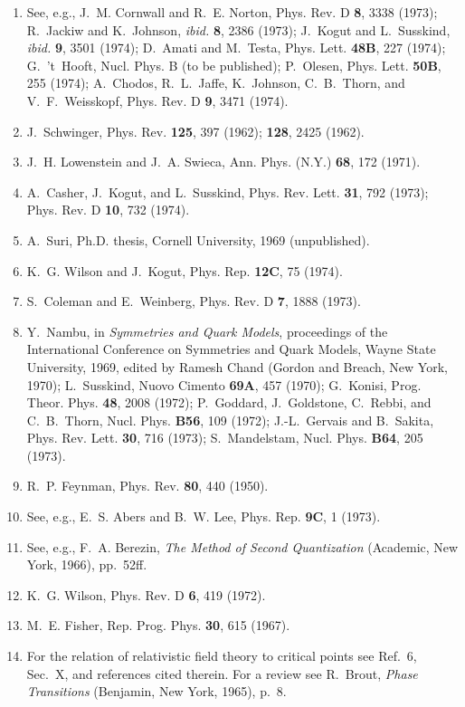 \begin{center}
\begin{minipage}{0.93\textwidth}
\begin{enumerate}[leftmargin=1.6em,itemsep=1pt,parsep=0pt,topsep=2pt]
\item See, e.g., J.~M. Cornwall and R.~E. Norton, Phys. Rev. D \textbf{8}, 3338 (1973); R.~Jackiw and K.~Johnson, \emph{ibid.} \textbf{8}, 2386 (1973); J.~Kogut and L.~Susskind, \emph{ibid.} \textbf{9}, 3501 (1974); D.~Amati and M.~Testa, Phys. Lett. \textbf{48B}, 227 (1974); G.~'t~Hooft, Nucl. Phys. B (to be published); P.~Olesen, Phys. Lett. \textbf{50B}, 255 (1974); A.~Chodos, R.~L.~Jaffe, K.~Johnson, C.~B.~Thorn, and V.~F.~Weisskopf, Phys. Rev. D \textbf{9}, 3471 (1974).
\item J.~Schwinger, Phys. Rev. \textbf{125}, 397 (1962); \textbf{128}, 2425 (1962).
\item J.~H. Lowenstein and J.~A. Swieca, Ann. Phys. (N.Y.) \textbf{68}, 172 (1971).
\item A.~Casher, J.~Kogut, and L.~Susskind, Phys. Rev. Lett. \textbf{31}, 792 (1973); Phys. Rev. D \textbf{10}, 732 (1974).
\item A.~Suri, Ph.D. thesis, Cornell University, 1969 (unpublished).
\item K.~G. Wilson and J.~Kogut, Phys. Rep. \textbf{12C}, 75 (1974).
\item S.~Coleman and E.~Weinberg, Phys. Rev. D \textbf{7}, 1888 (1973).
\item Y.~Nambu, in \emph{Symmetries and Quark Models}, proceedings of the International Conference on Symmetries and Quark Models, Wayne State University, 1969, edited by Ramesh Chand (Gordon and Breach, New York, 1970); L.~Susskind, Nuovo Cimento \textbf{69A}, 457 (1970); G.~Konisi, Prog. Theor. Phys. \textbf{48}, 2008 (1972); P.~Goddard, J.~Goldstone, C.~Rebbi, and C.~B.~Thorn, Nucl. Phys. \textbf{B56}, 109 (1972); J.-L.~Gervais and B.~Sakita, Phys. Rev. Lett. \textbf{30}, 716 (1973); S.~Mandelstam, Nucl. Phys. \textbf{B64}, 205 (1973).
\item R.~P. Feynman, Phys. Rev. \textbf{80}, 440 (1950).
\item See, e.g., E.~S. Abers and B.~W. Lee, Phys. Rep. \textbf{9C}, 1 (1973).
\item See, e.g., F.~A. Berezin, \emph{The Method of Second Quantization} (Academic, New York, 1966), pp.~52ff.
\item K.~G. Wilson, Phys. Rev. D \textbf{6}, 419 (1972).
\item M.~E. Fisher, Rep. Prog. Phys. \textbf{30}, 615 (1967).
\item For the relation of relativistic field theory to critical points see Ref.~6, Sec.~X, and references cited therein.  For a review see R.~Brout, \emph{Phase Transitions} (Benjamin, New York, 1965), p.~8.

\end{enumerate}
\end{minipage}
\end{center}
